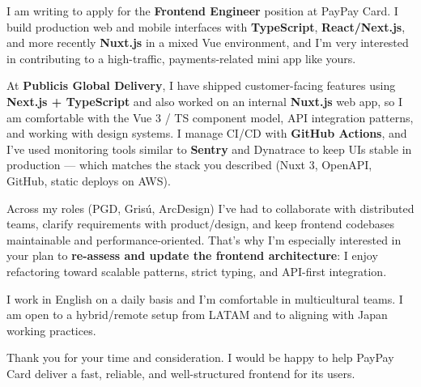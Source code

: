 \documentclass[11pt,a4paper]{awesome-cv}
\begin{document}
\makecvheader[R]
\makelettertitle

\begin{cvletter}

I am writing to apply for the \textbf{Frontend Engineer} position at PayPay Card. I build production web and mobile interfaces with \textbf{TypeScript}, \textbf{React/Next.js}, and more recently \textbf{Nuxt.js} in a mixed Vue environment, and I’m very interested in contributing to a high-traffic, payments-related mini app like yours.

At \textbf{Publicis Global Delivery}, I have shipped customer-facing features using \textbf{Next.js + TypeScript} and also worked on an internal \textbf{Nuxt.js} web app, so I am comfortable with the Vue 3 / TS component model, API integration patterns, and working with design systems. I manage CI/CD with \textbf{GitHub Actions}, and I’ve used monitoring tools similar to \textbf{Sentry} and Dynatrace to keep UIs stable in production — which matches the stack you described (Nuxt 3, OpenAPI, GitHub, static deploys on AWS).

Across my roles (PGD, Grisú, ArcDesign) I’ve had to collaborate with distributed teams, clarify requirements with product/design, and keep frontend codebases maintainable and performance-oriented. That’s why I’m especially interested in your plan to \textbf{re-assess and update the frontend architecture}: I enjoy refactoring toward scalable patterns, strict typing, and API-first integration.

I work in English on a daily basis and I’m comfortable in multicultural teams. I am open to a hybrid/remote setup from LATAM and to aligning with Japan working practices.

Thank you for your time and consideration. I would be happy to help PayPay Card deliver a fast, reliable, and well-structured frontend for its users.

\end{cvletter}

\makeletterclosing
\end{document}
